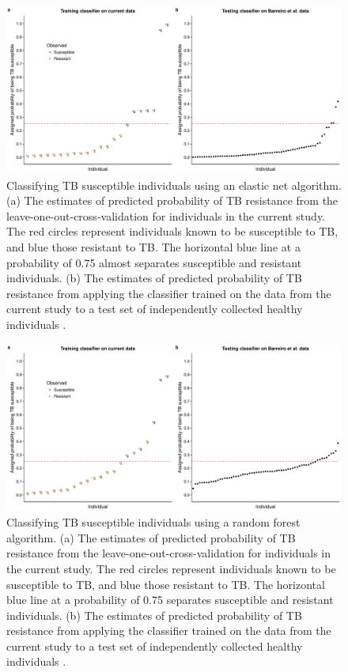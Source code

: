 \documentclass[fleqn,10pt]{wlscirep}
\begin{document}
\begin{figure}[ht]
\centering
\includegraphics[width=\linewidth]{../figure/classifier-en.pdf}
\caption{
Classifying TB susceptible individuals using an elastic net algorithm.
(a) The estimates of predicted probability of TB resistance from the
leave-one-out-cross-validation for individuals in the current study.
The red circles represent individuals known to be susceptible to TB,
and blue those resistant to TB. The horizontal blue line at a
probability of 0.75 almost separates susceptible and resistant
individuals. (b) The estimates of predicted probability of TB
resistance from applying the classifier trained on the data from the
current study to a test set of independently collected healthy
individuals \cite{Barreiro2012}.
}
\label{fig:class-en}
\end{figure}

\begin{figure}[ht]
\centering
\includegraphics[width=\linewidth]{../figure/classifier-rf.pdf}
\caption{
Classifying TB susceptible individuals using a random forest
algorithm. (a) The estimates of predicted probability of TB resistance
from the leave-one-out-cross-validation for individuals in the current
study. The red circles represent individuals known to be susceptible
to TB, and blue those resistant to TB. The horizontal blue line at a
probability of 0.75 separates susceptible and resistant individuals.
(b) The estimates of predicted probability of TB resistance from
applying the classifier trained on the data from the current study to
a test set of independently collected healthy individuals
\cite{Barreiro2012}.
}
\label{fig:class-rf}
\end{figure}
\clearpage\newpage
\end{document}
